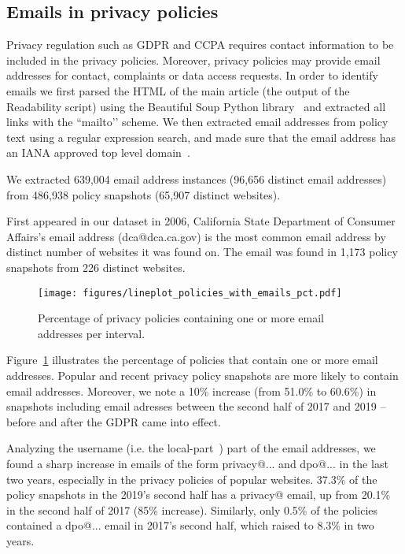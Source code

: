 \subsection{Emails in privacy policies}
\label{sec:policy-emails}

Privacy regulation such as GDPR and CCPA requires contact information to be included in the privacy policies.
Moreover, privacy policies may provide email addresses for contact, complaints or data access requests.
In order to identify emails we first parsed the HTML of the main article (the output of the Readability script) using the Beautiful Soup Python library~\cite{beautifulsoup4} and extracted all links with the ``mailto’’ scheme.
We then extracted email addresses from policy text using a regular expression search, and made sure that the email address has an IANA approved top level domain~\cite{iana-tld}.


We extracted 639,004 email address instances (96,656 distinct email addresses) from 486,938 policy snapshots (65,907 distinct websites).

First appeared in our dataset in 2006, California State Department of Consumer Affairs's email address (dca@dca.ca.gov) is the most common email address by distinct number of websites it was found on. The email was found in 1,173 policy snapshots from 226 distinct websites.


\begin{figure}[h]
\centering
\texttt{[image: figures/lineplot\_policies\_with\_emails\_pct.pdf]}
\caption{Percentage of privacy policies containing one or more email addresses per interval. }
\label{fig:pct-policies-with-emails}
\end{figure}


Figure~\ref{fig:pct-policies-with-emails} illustrates the percentage of policies
that contain one or more email addresses. Popular and recent privacy policy snapshots are more likely to contain email addresses.
Moreover, we note a 10\% increase (from 51.0\% to 60.6\%) in snapshots including email adresses between the second half of 2017 and 2019 -- before and after the GDPR came into effect. 

Analyzing the username (i.e. the local-part~\cite{email-local-part}) part of the email addresses,
we found a sharp increase in emails of the form 
privacy@... and dpo@... in the last two years, especially in the privacy policies of popular websites.
37.3\% of the policy snapshots in the 2019's second half has a privacy@ email,
up from 20.1\% in the second half of 2017 (85\% increase).
Similarly, only 0.5\% of the policies contained a dpo@... email in 2017's second half,
which raised to 8.3\% in two years.
